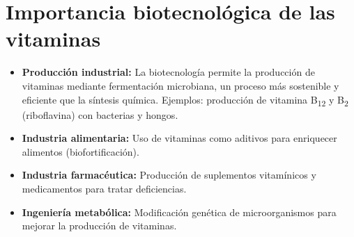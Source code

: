 
\section{Importancia biotecnológica de las vitaminas}

\begin{itemize}
    \item \textbf{Producción industrial:} La biotecnología permite la producción de vitaminas mediante fermentación microbiana, un proceso más sostenible y eficiente que la síntesis química. Ejemplos: producción de vitamina B\textsubscript{12} y B\textsubscript{2} (riboflavina) con bacterias y hongos.
    \item \textbf{Industria alimentaria:} Uso de vitaminas como aditivos para enriquecer alimentos (biofortificación).
    \item \textbf{Industria farmacéutica:} Producción de suplementos vitamínicos y medicamentos para tratar deficiencias.
    \item \textbf{Ingeniería metabólica:} Modificación genética de microorganismos para mejorar la producción de vitaminas.
\end{itemize}